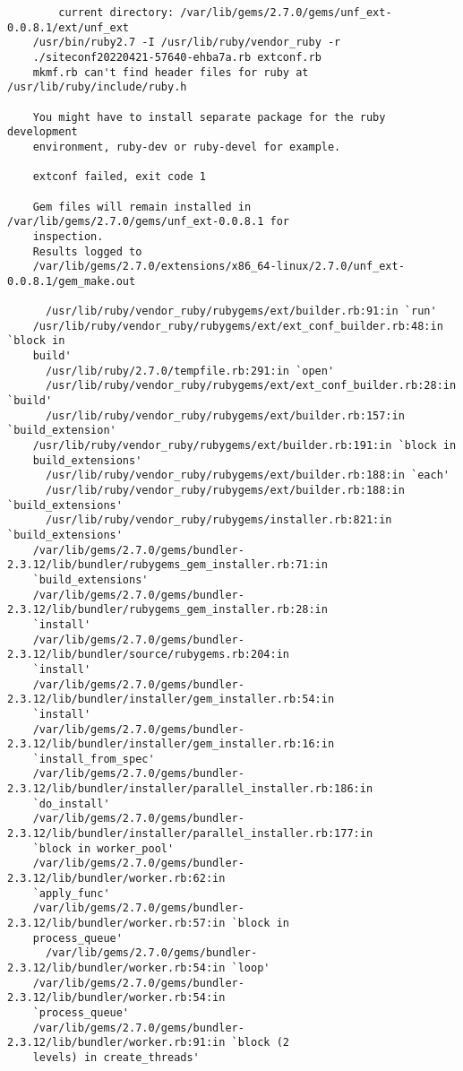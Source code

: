 \documentclass{article}
\numberwithin{equation}{section}
\begin{document}
\begin{verbatim}
	    current directory: /var/lib/gems/2.7.0/gems/unf_ext-0.0.8.1/ext/unf_ext
	/usr/bin/ruby2.7 -I /usr/lib/ruby/vendor_ruby -r
	./siteconf20220421-57640-ehba7a.rb extconf.rb
	mkmf.rb can't find header files for ruby at /usr/lib/ruby/include/ruby.h
	
	You might have to install separate package for the ruby development
	environment, ruby-dev or ruby-devel for example.
	
	extconf failed, exit code 1
	
	Gem files will remain installed in /var/lib/gems/2.7.0/gems/unf_ext-0.0.8.1 for
	inspection.
	Results logged to
	/var/lib/gems/2.7.0/extensions/x86_64-linux/2.7.0/unf_ext-0.0.8.1/gem_make.out
	
	  /usr/lib/ruby/vendor_ruby/rubygems/ext/builder.rb:91:in `run'
	/usr/lib/ruby/vendor_ruby/rubygems/ext/ext_conf_builder.rb:48:in `block in
	build'
	  /usr/lib/ruby/2.7.0/tempfile.rb:291:in `open'
	  /usr/lib/ruby/vendor_ruby/rubygems/ext/ext_conf_builder.rb:28:in `build'
	  /usr/lib/ruby/vendor_ruby/rubygems/ext/builder.rb:157:in `build_extension'
	/usr/lib/ruby/vendor_ruby/rubygems/ext/builder.rb:191:in `block in
	build_extensions'
	  /usr/lib/ruby/vendor_ruby/rubygems/ext/builder.rb:188:in `each'
	  /usr/lib/ruby/vendor_ruby/rubygems/ext/builder.rb:188:in `build_extensions'
	  /usr/lib/ruby/vendor_ruby/rubygems/installer.rb:821:in `build_extensions'
	/var/lib/gems/2.7.0/gems/bundler-2.3.12/lib/bundler/rubygems_gem_installer.rb:71:in
	`build_extensions'
	/var/lib/gems/2.7.0/gems/bundler-2.3.12/lib/bundler/rubygems_gem_installer.rb:28:in
	`install'
	/var/lib/gems/2.7.0/gems/bundler-2.3.12/lib/bundler/source/rubygems.rb:204:in
	`install'
	/var/lib/gems/2.7.0/gems/bundler-2.3.12/lib/bundler/installer/gem_installer.rb:54:in
	`install'
	/var/lib/gems/2.7.0/gems/bundler-2.3.12/lib/bundler/installer/gem_installer.rb:16:in
	`install_from_spec'
	/var/lib/gems/2.7.0/gems/bundler-2.3.12/lib/bundler/installer/parallel_installer.rb:186:in
	`do_install'
	/var/lib/gems/2.7.0/gems/bundler-2.3.12/lib/bundler/installer/parallel_installer.rb:177:in
	`block in worker_pool'
	/var/lib/gems/2.7.0/gems/bundler-2.3.12/lib/bundler/worker.rb:62:in
	`apply_func'
	/var/lib/gems/2.7.0/gems/bundler-2.3.12/lib/bundler/worker.rb:57:in `block in
	process_queue'
	  /var/lib/gems/2.7.0/gems/bundler-2.3.12/lib/bundler/worker.rb:54:in `loop'
	/var/lib/gems/2.7.0/gems/bundler-2.3.12/lib/bundler/worker.rb:54:in
	`process_queue'
	/var/lib/gems/2.7.0/gems/bundler-2.3.12/lib/bundler/worker.rb:91:in `block (2
	levels) in create_threads'
	

\end{verbatim}
\end{document}
